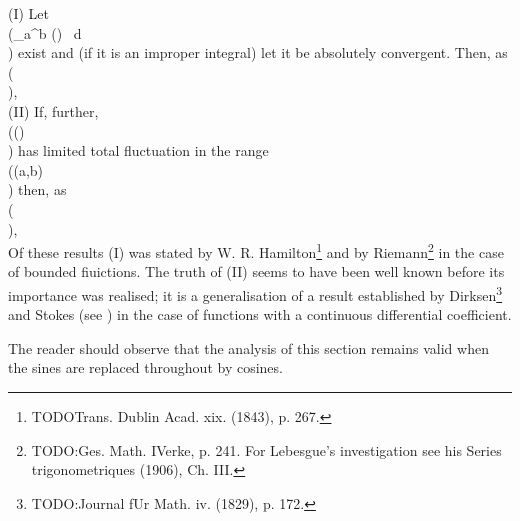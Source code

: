 (I) Let \\(\int_{a}^{b}\! \psi(\theta) \, d \theta\\) exist and (if it is an improper integral) let it be
absolutely convergent. Then, as \\(\lambda \rightarrow \infty\\),
\\[ 
\int_{a}^{b}\! \psi(\theta) \sin (\lamba \theta) \, d \theta
\quad
\textrm{is}
\quad
\littleo(1).
\\] 
(II) If, further, \\(\psi(\theta)\\) has limited total fluctuation in the range
\\((a,b)\\) then, as \\(\lambda \rightarrow \infty\\),
\\[ 
\int_{a}^{b}\! \psi(\theta) \sin (\lambda\theta) \, d \theta
\quad
\textrm{is}
\quad
\bigo(1 / \lambda).
\\] 

%
%

Of these results (I) %
was stated by W. R. Hamilton\footnote{TODOTrans. Dublin Acad. xix. (1843), p. 267.} and by
Riemann\footnote{TODO:Ges. Math. IVerke, p. 241. For Lebesgue's investigation see his
Series trigonometriques (1906), Ch. III.} in
the case of bounded fiuictions.
The truth of (II) %
seems to have been
well known before its importance was realised; it is a generalisation
of a result established by Dirksen\footnote{TODO:Journal fUr Math. iv. (1829), p. 172.}
and Stokes (see ) in the
case of functions with a continuous differential coefficient.

The reader should observe that the analysis of this section remains
valid when the sines are replaced throughout by cosines.

